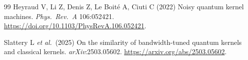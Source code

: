 \documentclass[pdflatex,sn-mathphys-num]{sn-jnl}
\theoremstyle{thmstyleone}
\theoremstyle{thmstyletwo}
\theoremstyle{thmstylethree}
\begin{document}
\begin{thebibliography}{99}
Heyraud V, Li Z, Denis Z, Le Boit{\'e} A, Ciuti C (2022)
Noisy quantum kernel machines.
\textit{Phys.\ Rev.\ A} 106:052421.
\url{https://doi.org/10.1103/PhysRevA.106.052421}.

Slattery L \emph{et al.}\ (2025) On the similarity of bandwidth-tuned
quantum kernels and classical kernels.
\textit{arXiv}:2503.05602.
\url{https://arxiv.org/abs/2503.05602}.

\end{thebibliography}
\end{document}

